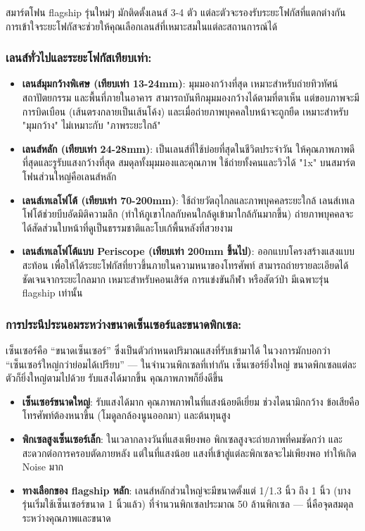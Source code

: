 
สมาร์ตโฟน flagship รุ่นใหม่ๆ มักติดตั้งเลนส์ 3-4 ตัว แต่ละตัวจะรองรับระยะโฟกัสที่แตกต่างกัน การเข้าใจระยะโฟกัสจะช่วยให้คุณเลือกเลนส์ที่เหมาะสมในแต่ละสถานการณ์ได้

\subsubsection*{เลนส์ทั่วไปและระยะโฟกัสเทียบเท่า:}

\begin{itemize}
  \item \textbf{เลนส์มุมกว้างพิเศษ (เทียบเท่า 13-24mm)}: มุมมองกว้างที่สุด เหมาะสำหรับถ่ายทิวทัศน์ สถาปัตยกรรม และพื้นที่ภายในอาคาร สามารถบันทึกมุมมองกว้างได้ตามที่ตาเห็น แต่ขอบภาพจะมีการบิดเบือน (เส้นตรงกลายเป็นเส้นโค้ง) และเมื่อถ่ายภาพบุคคลใบหน้าจะถูกยืด เหมาะสำหรับ "มุมกว้าง" ไม่เหมาะกับ "ภาพระยะใกล้"
  \item \textbf{เลนส์หลัก (เทียบเท่า 24-28mm)}: เป็นเลนส์ที่ใช้บ่อยที่สุดในชีวิตประจำวัน ให้คุณภาพภาพดีที่สุดและรูรับแสงกว้างที่สุด สมดุลทั้งมุมมองและคุณภาพ ใช้ถ่ายทั้งคนและวิวได้ "1x" บนสมาร์ตโฟนส่วนใหญ่คือเลนส์หลัก
  \item \textbf{เลนส์เทเลโฟโต้ (เทียบเท่า 70-200mm)}: ใช้ถ่ายวัตถุไกลและภาพบุคคลระยะใกล้ เลนส์เทเลโฟโต้ช่วยบีบอัดมิติความลึก (ทำให้ภูเขาไกลกับคนใกล้ดูเข้ามาใกล้กันมากขึ้น) ถ่ายภาพบุคคลจะได้สัดส่วนใบหน้าที่ดูเป็นธรรมชาติและโบเก้พื้นหลังที่สวยงาม
  \item \textbf{เลนส์เทเลโฟโต้แบบ Periscope (เทียบเท่า 200mm ขึ้นไป)}: ออกแบบโครงสร้างแสงแบบสะท้อน เพื่อให้ได้ระยะโฟกัสที่ยาวขึ้นภายในความหนาของโทรศัพท์ สามารถถ่ายรายละเอียดได้ชัดเจนจากระยะไกลมาก เหมาะสำหรับคอนเสิร์ต การแข่งขันกีฬา หรือสัตว์ป่า มีเฉพาะรุ่น flagship เท่านั้น
\end{itemize}

\subsubsection*{การประนีประนอมระหว่างขนาดเซ็นเซอร์และขนาดพิกเซล:}

เซ็นเซอร์คือ “ขนาดเซ็นเซอร์” ซึ่งเป็นตัวกำหนดปริมาณแสงที่รับเข้ามาได้ ในวงการมักบอกว่า “เซ็นเซอร์ใหญ่กว่าย่อมได้เปรียบ” — ในจำนวนพิกเซลที่เท่ากัน เซ็นเซอร์ยิ่งใหญ่ ขนาดพิกเซลแต่ละตัวก็ยิ่งใหญ่ตามไปด้วย รับแสงได้มากขึ้น คุณภาพภาพก็ยิ่งดีขึ้น

\begin{itemize}
  \item \textbf{เซ็นเซอร์ขนาดใหญ่}: รับแสงได้มาก คุณภาพภาพในที่แสงน้อยดีเยี่ยม ช่วงไดนามิกกว้าง ข้อเสียคือโทรศัพท์ต้องหนาขึ้น (โมดูลกล้องนูนออกมา) และต้นทุนสูง
  \item \textbf{พิกเซลสูงเซ็นเซอร์เล็ก}: ในเวลากลางวันที่แสงเพียงพอ พิกเซลสูงจะถ่ายภาพที่คมชัดกว่า และสะดวกต่อการครอบตัดภายหลัง แต่ในที่แสงน้อย แสงที่เข้าสู่แต่ละพิกเซลจะไม่เพียงพอ ทำให้เกิด Noise มาก
  \item \textbf{ทางเลือกของ flagship หลัก}: เลนส์หลักส่วนใหญ่จะมีขนาดตั้งแต่ 1/1.3 นิ้ว ถึง 1 นิ้ว (บางรุ่นเริ่มใช้เซ็นเซอร์ขนาด 1 นิ้วแล้ว) ที่จำนวนพิกเซลประมาณ 50 ล้านพิกเซล — นี่คือจุดสมดุลระหว่างคุณภาพและขนาด
\end{itemize}

